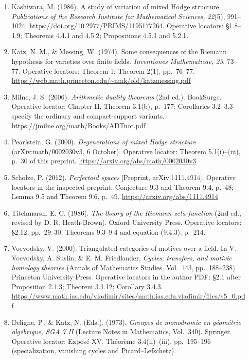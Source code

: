 \begin{enumerate}[leftmargin=*,label={}]
cycles. In \emph{Algebraic geometry, Bombay 1968} (pp.~193--199).
Oxford University Press. Operative locators: \S2, p.~195;
\S3, pp.~195--197; \S4 and Remarks 2--4, pp.~197--198.
\url{https://download.uni-mainz.de/mathematik/Algebraische%20Geometrie/Lehre/WS23.Padische.1968.Grothendieck.StandardConjs.pdf}
\item Kashiwara, M. (1986). A study of variation of mixed Hodge
structure. \emph{Publications of the Research Institute for Mathematical
Sciences, 22}(5), 991--1024.
\url{https://doi.org/10.2977/PRIMS/1195177264}.
Operative locators: \S1.8--1.9; Theorems 4.4.1 and 4.5.2;
Propositions 4.5.1 and 5.2.1.
\item Katz, N. M., \& Messing, W. (1974). Some consequences of the
Riemann hypothesis for varieties over finite fields.
\emph{Inventiones Mathematicae, 23}, 73--77.
Operative locators: Theorem 1; Theorem 2(1), pp.~76--77.
\url{https://web.math.princeton.edu/~nmk/old/katzmessing.pdf}
\item Milne, J. S. (2006). \emph{Arithmetic duality theorems} (2nd ed.).
BookSurge. Operative locator: Chapter II, Theorem 3.1(b), p.~177;
Corollaries 3.2--3.3 specify the ordinary and compact-support variants.
\url{https://jmilne.org/math/Books/ADTnot.pdf}
\item Pearlstein, G. (2000). \emph{Degenerations of mixed Hodge structure}
(arXiv:math/0002030v3, 6 October). Operative locator: Theorem 5.1(i)--(iii),
p.~30 of this preprint. \url{https://arxiv.org/abs/math/0002030v3}
\item Scholze, P. (2012). \emph{Perfectoid spaces}
[Preprint, arXiv:1111.4914]. Operative locators in the inspected
preprint: Conjecture 9.3 and Theorem 9.4, p.~48;
Lemma 9.5 and Theorem 9.6, p.~49.
\url{https://arxiv.org/abs/1111.4914}
\item Titchmarsh, E. C. (1986). \emph{The theory of the Riemann
zeta-function} (2nd ed., revised by D. R. Heath-Brown).
Oxford University Press. Operative locators: \S2.12,
pp.~29--30; Theorems 9.3--9.4 and equation (9.4.3), p.~214.
\item Voevodsky, V. (2000). Triangulated categories of motives
over a field. In V. Voevodsky, A. Suslin, \& E. M. Friedlander,
\emph{Cycles, transfers, and motivic homology theories}
(Annals of Mathematics Studies, Vol.~143, pp.~188--238).
Princeton University Press. Operative locators in the author PDF:
\S2.1 after Proposition 2.1.3; Theorem 3.1.12; Corollary 3.4.3.
\url{https://www.math.ias.edu/vladimir/sites/math.ias.edu.vladimir/files/s5_0.pdf}
\item Deligne, P., \& Katz, N. (Eds.). (1973).
\emph{Groupes de monodromie en g\'eom\'etrie alg\'ebrique,
SGA 7 II} (Lecture Notes in Mathematics, Vol.~340). Springer.
Operative locator: Expos\'e XV, Th\'eor\`eme 3.4(ii)--(iii),
pp.~195--196 (specialization, vanishing cycles and Picard--Lefschetz).
\end{enumerate}
